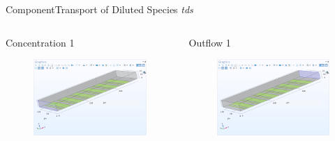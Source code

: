 \documentclass[10pt]{beamer}
\begin{document}
\begin{frame}{Component}{Transport of Diluted Species \textit{tds}}
    \begin{columns}[onlytextwidth]
        \begin{column}{0.5\textwidth}
            Concentration 1
            \begin{figure}[H]
                \centering
                \includegraphics[width=0.9\columnwidth]{6.png}
            \end{figure}
        \end{column}
        \begin{column}{0.5\textwidth}
            Outflow 1
            \begin{figure}[H]
                \centering
                \includegraphics[width=0.9\columnwidth]{7.png}
            \end{figure}
        \end{column}
    \end{columns}
\end{frame}
\end{document}
